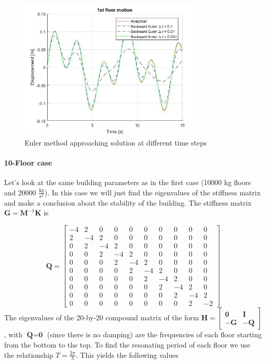 \documentclass{article}
\begin{document}
				\begin{figure}[h!]
   					 \centering
   					 \includegraphics[width=90mm]{pictures/Eulerdiff.jpg}
   					 \caption{Euler method approaching solution at different time steps}
				            \label{fig9}
  				\end{figure}

				\paragraph{10-Floor case} Let's look at the same building parameters as in the first case (10000 kg floors and 20000 $\frac{\text{kg}}{\text{s}^2}$). In this case we will just find the eigenvalues of the stiffness matrix and make a conclusion about the stability of the building. The stiffness matrix $\textbf{G} = \textbf{M}^{-1}\textbf{K}$ is 

				\begin{equation*}
					\textbf{Q}=  \begin{bmatrix}-4&2&0&0&0&0&0&0&0&0\\2&-4&2&0&0&0&0&0&0&0\\0&2&-4&2&0&0&0&0&0&0\\0&0&2&-4&2&0&0&0&0&0\\0&0&0&2&-4&2&0&0&0&0\\
				  0&0&0&0&2&-4&2&0&0&0\\0&0&0&0&0&2&-4&2&0&0\\0&0&0&0&0&0&2&-4&2&0\\0&0&0&0&0&0&0&2&-4&2\\0&0&0&0&0&0&0&0&2&-2\end{bmatrix}
				\end{equation*}
The eigenvalues of the 20-by-20 compound matrix of the form $\textbf{H} = \begin{bmatrix} \textbf{0} & \textbf{I} \\ -\textbf{G} &-\textbf{Q}\end{bmatrix}$, with $\textbf{Q}=\textbf{0}$ (since there is no damping) are the frequencies of each floor starting from the bottom to the top. To find the resonating period of each floor we use the relationship $T=\frac{2\pi}{\lambda}$. This yields the following values
\end{document}
